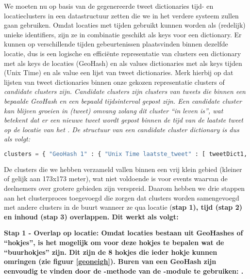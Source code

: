 {{We moeten nu op basis van de gegenereerde tweet dictionaries tijd- en 
locatieclusters in een datastructuur zetten die we in het verdere systeem zullen 
gaan gebruiken. Omdat locaties met tijden gebruikt kunnen worden als (redelijk) 
unieke identifiers, zijn ze in combinatie geschikt als keys voor een dictionary. 
Er kunnen op verschillende tijden gebeurtenissen plaatsvinden binnen dezelfde 
locatie, dus is een logische en efficiënte representatie van clusters een 
dictionary met als keys de locaties (GeoHash) en als values dictionaries met als 
keys tijden (Unix Time) en als value een lijst van tweet dictionaries.  
\vl
Merk hierbij op dat lijsten van tweet dictionaries binnen onze gekozen 
representatie clusters of \it{candidate clusters} zijn. Candidate clusters zijn 
clusters van tweets die binnen een bepaalde GeoHash en een bepaald tijdsinterval 
gepost zijn. Een candidate cluster kan blijven groeien in (tweet) omvang zolang 
dit cluster “in leven is”, wat betekent dat er een nieuwe tweet wordt gepost 
binnen de tijd van de laatste tweet op de locatie van het .
\vl
De structuur van een candidate cluster dictionary is dus als volgt:

\begin{lstlisting}[language=Python]
clusters = { "GeoHash 1" : { "Unix Time laatste_tweet" : [ tweetDict1, ...], ...}, ...}
\end{lstlisting}
\vspace*{-10pt}


De clusters die we hebben verzameld vallen binnen een vrij klein gebied (kleiner 
of gelijk aan 173x173 meter), wat niet voldoende is voor events waarvan de 
deelnemers over grotere gebieden zijn verspreid. Daarom hebben we drie stappen 
aan het clusterproces toegevoegd die zorgen dat clusters worden samengevoegd met 
andere clusters in de buurt wanneer ze qua locatie (\bf{stap 1}), tijd (\bf{stap 2}) en 
inhoud (\bf{stap 3}) overlappen. Dit werkt als volgt:

\begin{bullets}
\item \bf{Stap 1 - Overlap op locatie}: Omdat locaties bestaan uit GeoHashes of 
“hokjes”, is het mogelijk om voor deze hokjes te bepalen wat de “buurhokjes” 
zijn. Dit zijn de 8 hokjes die ieder hokje kunnen omringen (zie figuur \ref{geoneigh}). Buren 
van een GeoHash zijn eenvoudig te vinden door de -methode van de 
-module te gebruiken: .


\end{bullets}}}
